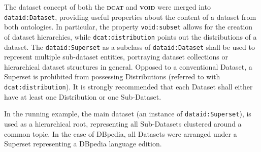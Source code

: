 \documentclass[a4paper,english,twoside,BCOR1.5cm,headsepline,DIV12,appendixprefix,final,12pt]{scrbook}
\newcommand{\void}{{\scshape\bfseries void}\xspace}
\newcommand{\dcat}{{\scshape\bfseries dcat}\xspace}
\newcommand{\prop}[1]{{{\texttt{#1}}}}
\begin{document}
The dataset concept of both the \dcat and \void were merged into \prop{dataid:Dataset}, providing useful properties about the content of a dataset from both ontologies. In particular, the property \prop{void:subset} allows for the creation of dataset hierarchies, while \prop{dcat:distribution} points out the distributions of a dataset. The \prop{dataid:Superset} as a subclass of \prop{dataid:Dataset} shall be used to represent multiple sub-dataset entities, portraying dataset collections or hierarchical dataset structures in general. Opposed to a conventional Dataset, a Superset is prohibited from possessing Distributions (referred to with \prop{dcat:distribution}). It is strongly recommended that each Dataset shall either have at least one Distribution or one Sub-Dataset. 

In the running example, the main dataset (an instance of \prop{dataid:Superset}), is used as a hierarchical root, representing all Sub-Datasets clustered around a common topic. In the case of DBpedia, all Datasets were arranged under a Superset representing a DBpedia language edition.
\end{document}

